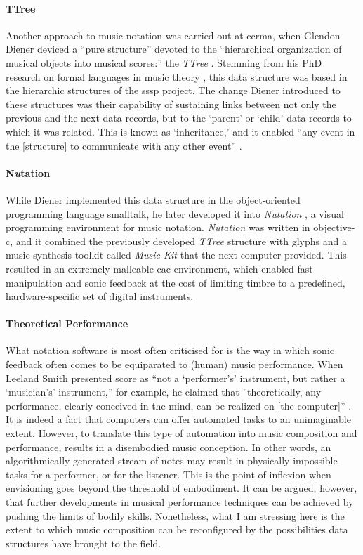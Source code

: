 \paragraph{TTree}
Another approach to music notation was carried out at \gls{ccrma}, when Glendon Diener \parencite{icmc/bbp2372.1988.020, 10.2307/3680043} deviced a ``pure structure'' devoted to the ``hierarchical organization of musical objects into musical scores:'' the \textit{TTree} \parencite[184]{icmc/bbp2372.1988.020}. Stemming from his PhD research on formal languages in music theory \parencite{diener1985}, this data structure was based in the hierarchic structures of the \gls{sssp} project. The change Diener introduced to these structures was their capability of sustaining links between not only the previous and the next data records, but to the `parent' or `child' data records to which it was related. This is known as `inheritance,' and it enabled ``any event in the [structure] to communicate with any other event'' \parencite[188]{icmc/bbp2372.1988.020}.

\paragraph{N\textit{u}tation}
While Diener implemented this data structure in the object-oriented programming language \gls{smalltalk}, he later developed it into \textit{Nutation} \parencite{DBLP:conf/icmc/Diener92}, a visual programming environment for music notation. \textit{Nutation} was written in \gls{objective-c}, and it combined the previously developed \textit{TTree} structure with glyphs and a music synthesis toolkit called \textit{Music Kit} that the \gls{next} computer provided. This resulted in an extremely malleable \gls{cac} environment, which enabled fast manipulation and sonic feedback at the cost of limiting timbre to a predefined, hardware-specific set of digital instruments. 

\paragraph{Theoretical Performance}
What notation software is most often criticised for is the way in which sonic feedback often comes to be equiparated to (human) music performance. When Leeland Smith presented \gls{score} as ``not a `performer's' instrument, but rather a `musician's' instrument,'' for example, he claimed that ''theoretically, any performance, clearly conceived in the mind, can be realized on [the computer]'' \parencite[14]{smith1971}. It is indeed a fact that computers can offer automated tasks to an unimaginable extent. However, to translate this type of automation into music composition and performance, results in a disembodied music conception. In other words, an algorithmically generated stream of notes may result in physically impossible tasks for a performer, or for the listener. This is the point of inflexion when envisioning goes beyond the threshold of embodiment. It can be argued, however, that further developments in musical performance techniques can be achieved by pushing the limits of bodily skills. Nonetheless, what I am stressing here is the extent to which music composition can be reconfigured by the possibilities data structures have brought to the field.

